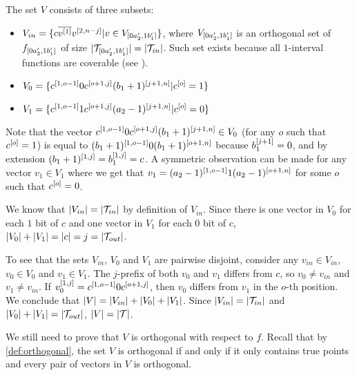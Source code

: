 The set $V$ consists of three subsets:
\begin{itemize}
\item $V_{in} = \{c \overline{v^{[1]}} v^{[2, n-j]}
| v \in V_{[0 a_2', 1 b_1']}\}$,
where $V_{[0 a_2', 1 b_1']}$ is an orthogonal set of $f_{[0 a_2', 1 b_1']}$
of size $\lvert\mathcal{T}_{[0 a_2', 1 b_1']}\rvert = \lvert\mathcal{T}_{in}\rvert$.
Such set exists because all $1$-interval functions
are coverable
(see ).

\item $V_0 =
\{c^{[1, o - 1]} 0 c^{[o + 1, j]} (b_1 + 1)^{[j+1, n]}
| c^{[o]} = 1\}$

\item $V_1 =
\{c^{[1, o - 1]} 1 c^{[o + 1, j]} (a_2 - 1)^{[j+1, n]}
| c^{[o]} = 0\}$
\end{itemize}

Note that the vector
$c^{[1, o - 1]} 0 c^{[o + 1, j]} (b_1 + 1)^{[j+1, n]} \in V_0$
(for any $o$ such that $c^{[o]} = 1$)
is equal to
$(b_1+1)^{[1, o - 1]} 0 (b_1+1)^{[o + 1, n]}$
because $b_1^{[j+1]} = 0$,
and by extension
$(b_1+1)^{[1, j]} = b_1^{[1, j]} = c$.
A symmetric observation can be made
for any vector $v_1 \in V_1$
where we get that
$v_1 = (a_2-1)^{[1, o-1]} 1 (a_2-1)^{[o+1, n]}$
for some $o$ such that $c^{[o]} = 0$.

We know that
$\lvert V_{in}\rvert = \lvert\mathcal{T}_{in}\rvert$
by definition of $V_{in}$.
Since there is one vector in $V_0$
for each $1$ bit of $c$
and one vector in $V_1$
for each $0$ bit of $c$,
$\lvert V_0\rvert + \lvert V_1\rvert = \lvert c\rvert = j = \lvert\mathcal{T}_{out}\rvert$.

To see that the sets $V_{in}$, $V_0$ and $V_1$ are pairwise disjoint,
consider any $v_{in} \in V_{in}$, $v_0 \in V_0$ and $v_1 \in V_1$.
The $j$-prefix of both $v_0$ and $v_1$ differs from $c$,
so $v_0 \neq v_{in}$ and $v_1 \neq v_{in}$.
If $v_0^{[1, j]} = c^{[1, o-1]} 0 c^{[o+1, j]}$,
then $v_0$ differs from $v_1$ in the $o$-th position.
We conclude that $\lvert V\rvert = \lvert V_{in}\rvert + \lvert V_0\rvert + \lvert V_1\rvert$.
Since $\lvert V_{in}\rvert = \lvert\mathcal{T}_{in}\rvert$
and $\lvert V_0\rvert + \lvert V_1\rvert = \lvert\mathcal{T}_{out}\rvert$,
$\lvert V\rvert = \lvert\mathcal{T}\rvert$.

We still need to prove that $V$ is orthogonal
with respect to $f$.
Recall that by \cref{def:orthogonal},
the set $V$ is orthogonal
if and only if
it only contains true points
and every pair of vectors in $V$ is orthogonal.

